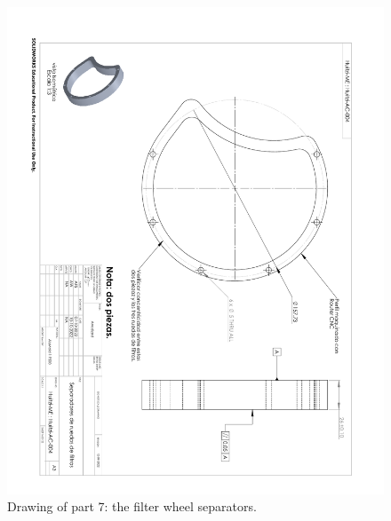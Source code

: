 \begin{figure}
\begin{center}
\includegraphics[angle=180,width=0.9\linewidth]{figures/huitzi-f20-part-7.pdf}
\end{center}
\caption{Drawing of part 7: the filter wheel separators.}
\label{figure:huitzi-f20-part-7}
\end{figure}

